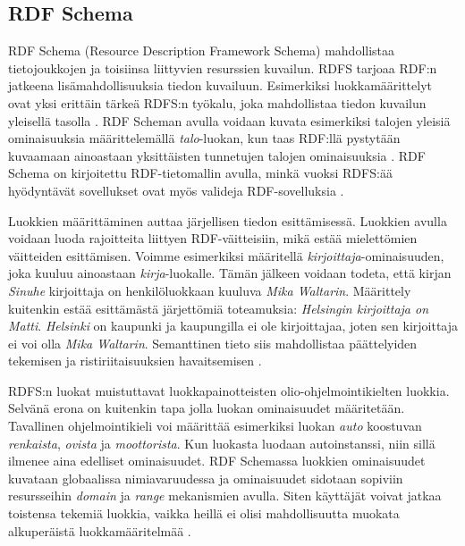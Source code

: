 \documentclass[finnish, 12pt, a4paper, elec, utf8, pdfa, online]{aaltothesis}
\begin{document}
{\subsection{RDF Schema}
RDF Schema (Resource Description Framework Schema) mahdollistaa tietojoukkojen ja toisiinsa liittyvien resurssien kuvailun. RDFS tarjoaa RDF:n jatkeena lisämahdollisuuksia tiedon kuvailuun. Esimerkiksi luokkamäärittelyt ovat yksi erittäin tärkeä RDFS:n työkalu, joka mahdollistaa tiedon kuvailun yleisellä tasolla \cite{W3C_RDFS2}. RDF Scheman avulla voidaan kuvata esimerkiksi talojen yleisiä ominaisuuksia määrittelemällä \textit{talo}-luokan, kun taas RDF:llä pystytään kuvaamaan ainoastaan yksittäisten tunnetujen talojen ominaisuuksia \cite{Antoniou}. RDF Schema on kirjoitettu RDF-tietomallin avulla, minkä vuoksi RDFS:ää hyödyntävät sovellukset ovat myös valideja RDF-sovelluksia \cite{RDF_specification_old}.

Luokkien määrittäminen auttaa järjellisen tiedon esittämisessä. Luokkien avulla voidaan luoda rajoitteita liittyen RDF-väitteisiin, mikä estää mielettömien väitteiden esittämisen. Voimme esimerkiksi määritellä \textit{kirjoittaja}-ominaisuuden, joka kuuluu ainoastaan \textit{kirja}-luokalle. Tämän jälkeen voidaan todeta, että kirjan \textit{Sinuhe} kirjoittaja on henkilöluokkaan kuuluva \textit{Mika Waltarin}. Määrittely kuitenkin estää esittämästä järjettömiä toteamuksia: \textit{Helsingin kirjoittaja on Matti}. \textit{Helsinki} on kaupunki ja kaupungilla ei ole kirjoittajaa, joten sen kirjoittaja ei voi olla \textit{Mika Waltarin}. Semanttinen tieto siis mahdollistaa päättelyiden tekemisen ja ristiriitaisuuksien havaitsemisen \cite{Antoniou}.

RDFS:n luokat muistuttavat luokkapainotteisten olio-ohjelmointikielten luokkia. Selvänä erona on kuitenkin tapa jolla luokan ominaisuudet määritetään. Tavallinen ohjelmointikieli voi määrittää esimerkiksi luokan \textit{auto} koostuvan \textit{renkaista}, \textit{ovista} ja \textit{moottorista}. Kun luokasta luodaan autoinstanssi, niin sillä ilmenee aina edelliset ominaisuudet. RDF Schemassa luokkien ominaisuudet kuvataan globaalissa nimiavaruudessa ja ominaisuudet sidotaan sopiviin resursseihin \textit{domain} ja \textit{range} mekanismien avulla. Siten käyttäjät voivat jatkaa toistensa tekemiä luokkia, vaikka heillä ei olisi mahdollisuutta muokata alkuperäistä luokkamääritelmää \cite{Antoniou} \cite{W3C_RDFS2}.

}
\end{document}
